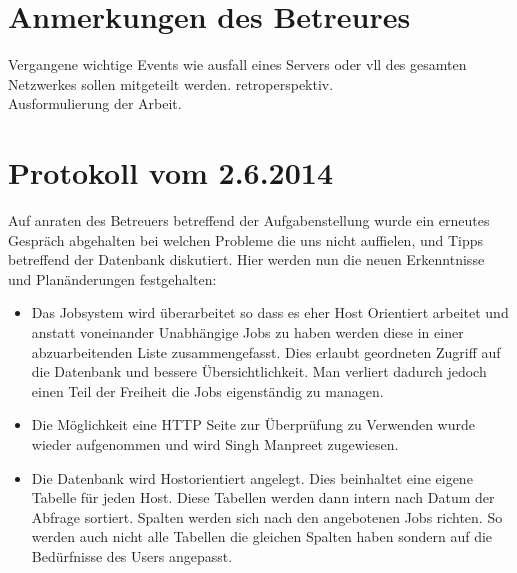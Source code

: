 \documentclass[10pt,a4paper]{report}
\begin{document}
\chapter{Anmerkungen des Betreures}
Vergangene wichtige Events wie ausfall eines Servers oder vll des gesamten Netzwerkes sollen mitgeteilt werden. retroperspektiv.\\
Ausformulierung der Arbeit.\\
\chapter{Protokoll vom 2.6.2014}
Auf anraten des Betreuers betreffend der Aufgabenstellung wurde ein erneutes Gespräch abgehalten bei welchen Probleme die uns nicht auffielen, und Tipps betreffend der Datenbank diskutiert. Hier werden nun die neuen Erkenntnisse und Planänderungen festgehalten:
\begin{itemize}
\item Das Jobsystem wird überarbeitet so dass es eher Host Orientiert arbeitet und anstatt voneinander Unabhängige Jobs zu haben werden diese in einer abzuarbeitenden Liste zusammengefasst. Dies erlaubt geordneten Zugriff auf die Datenbank und bessere Übersichtlichkeit. Man verliert dadurch jedoch einen Teil der Freiheit die Jobs eigenständig zu managen. 
\item Die Möglichkeit eine HTTP Seite zur Überprüfung zu Verwenden wurde wieder aufgenommen und wird Singh Manpreet zugewiesen. 
\item Die Datenbank wird Hostorientiert angelegt. Dies beinhaltet eine eigene Tabelle für jeden Host. Diese Tabellen werden dann intern nach Datum der Abfrage sortiert. Spalten werden sich nach den angebotenen Jobs richten. So werden auch nicht alle Tabellen die gleichen Spalten haben sondern auf die Bedürfnisse des Users angepasst. 
\end{itemize}
\end{document}
